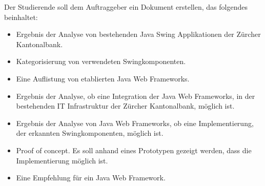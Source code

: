 Der Studierende soll dem Auftraggeber ein Dokument erstellen, das folgendes
beinhaltet:

\begin{itemize}    
  \item Ergebnis der Analyse von bestehenden Java Swing Applikationen der
  Zürcher Kantonalbank.
  \item Kategorisierung von verwendeten Swingkomponenten.
  \item Eine Auflistung von etablierten Java Web Frameworks.
  \item Ergebnis der Analyse, ob eine Integration der Java Web Frameworks, in
  der bestehenden IT Infrastruktur der Zürcher Kantonalbank, möglich ist.
  \item Ergebnis der Analyse von Java Web Frameworks, ob eine Implementierung,
  der erkannten Swingkomponenten, möglich ist.
  \item Proof of concept. Es soll anhand eines Prototypen gezeigt werden, dass
  die Implementierung möglich ist.
  \item Eine Empfehlung für ein Java Web Framework.
\end{itemize}
